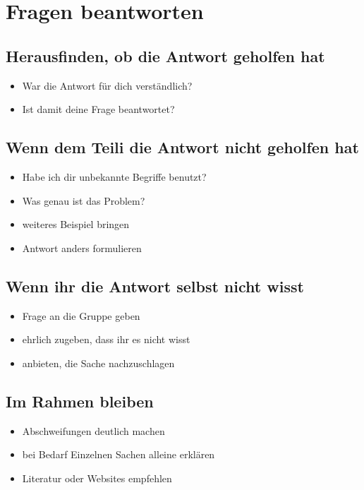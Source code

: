\section{Fragen beantworten}

\subsection{Herausfinden, ob die Antwort geholfen hat}
\begin{itemize}
  \item War die Antwort für dich verständlich?
  \item Ist damit deine Frage beantwortet?
\end{itemize}

\subsection{Wenn dem Teili die Antwort nicht geholfen hat}
\begin{itemize}
  \item Habe ich dir unbekannte Begriffe benutzt?
  \item Was genau ist das Problem?
  \item weiteres Beispiel bringen
  \item Antwort anders formulieren
\end{itemize}

\subsection{Wenn ihr die Antwort selbst nicht wisst}
\begin{itemize}
  \item Frage an die Gruppe geben
  \item ehrlich zugeben, dass ihr es nicht wisst
  \item anbieten, die Sache nachzuschlagen
\end{itemize}

\subsection{Im Rahmen bleiben}
\begin{itemize}
  \item Abschweifungen deutlich machen
  \item bei Bedarf Einzelnen Sachen alleine erklären
  \item Literatur oder Websites empfehlen
\end{itemize}
